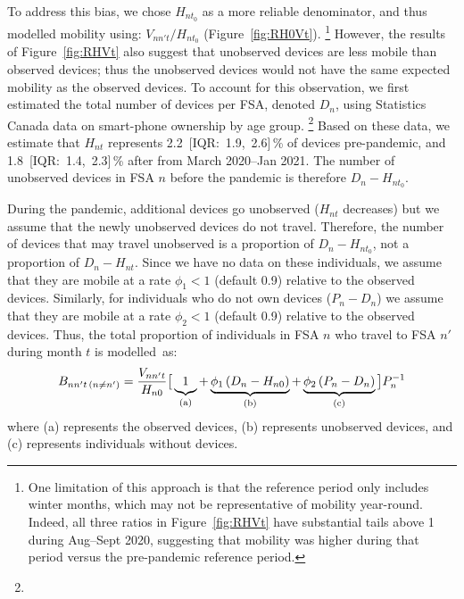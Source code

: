To address this bias, we chose $H_{nt_0}$ as a more reliable denominator,
and thus modelled mobility using: $V_{nn't} / H_{nt_0}$ (Figure~\ref{fig:RH0Vt}).%
\footnote{One limitation of this approach is that the reference period only includes winter months,
  which may not be representative of mobility year-round.
  Indeed, all three ratios in Figure~\ref{fig:RHVt} have substantial tails above 1 during Aug--Sept 2020,
  suggesting that mobility was higher during that period versus the pre-pandemic reference period.}
However, the results of Figure~\ref{fig:RHVt} also suggest that
unobserved devices are less mobile than observed devices;
thus the unobserved devices would not have the same expected mobility as the observed devices.
To account for this observation, we first estimated the total number of devices per FSA, denoted $D_n$,
using Statistics Canada data on smart-phone ownership by age group.%
\footnote{}
Based on these data, we estimate that $H_{nt}$ represents
2.2~[IQR:~1.9,~2.6]\,\% of devices pre-pandemic, and
1.8~[IQR:~1.4,~2.3]\,\% after from March 2020--Jan 2021.
The number of unobserved devices in FSA $n$ before the pandemic is therefore $D_n - H_{nt_0}$.
\par
During the pandemic, additional devices go unobserved ($H_{nt}$ decreases)
but we assume that the newly unobserved devices do not travel.
Therefore, the number of devices that may travel unobserved
is a proportion of $D_n - H_{nt_0}$, not a proportion of $D_n - H_{nt}$.
Since we have no data on these individuals, we assume that they are mobile
at a rate $\phi_1 < 1$ (default 0.9) relative to the observed devices.
Similarly, for individuals who do not own devices ($P_n - D_n$) we assume that they are mobile
at a rate $\phi_2 < 1$ (default 0.9) relative to the observed devices.
Thus, the total proportion of individuals in FSA $n$ who travel to FSA $n'$ during month $t$ is modelled~as:
\begin{equation}\label{eq:Bnnt.inter}
  B_{nn't \,(n\ne n')} = \frac{V_{nn't}}{H_{n0}} \big[
  \underbrace{1\vphantom{\phi}}_{\textrm{(a)}}
  + \underbrace{\phi_1 \left(D_n - H_{n0}\right)}_{\textrm{(b)}}
  + \underbrace{\phi_2 \left(P_n - D_n\right)}_{\textrm{(c)}} \big] P_n^{-1}
\end{equation}
where (a) represents the observed devices,
(b) represents unobserved devices, and
(c) represents individuals without devices.
